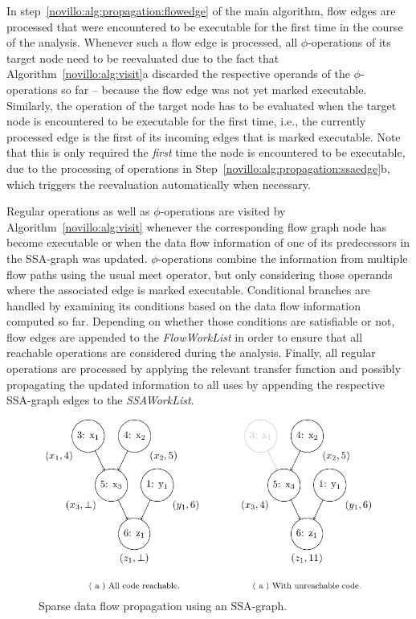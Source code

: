 In step~\ref{novillo:alg:propagation:flowedge} of the main algorithm, flow edges
are processed that were encountered to be executable for the first time in the
course of the analysis. Whenever such a flow edge is processed, all
$\phi$-operations of its target node need to be reevaluated due to the fact that
Algorithm~\ref{novillo:alg:visit}a discarded the respective operands of the
$\phi$-operations so far -- because the flow edge was not yet marked executable.
Similarly, the operation of the target node has to be evaluated when the target
node is encountered to be executable for the first time, i.e., the currently
processed edge is the first of its incoming edges that is marked executable.
Note that this is only required the \emph{first} time the node is
encountered to be executable, due to the processing of operations in
Step~\ref{novillo:alg:propagation:ssaedge}b, which triggers the reevaluation
automatically when necessary.

Regular operations as well as $\phi$-operations are visited by
Algorithm~\ref{novillo:alg:visit} whenever the corresponding flow graph node has
become executable or when the data flow information of one of its predecessors
in the SSA-graph was updated. $\phi$-operations combine the information from
multiple flow paths using the usual meet operator, but only considering those
operands where the associated edge is marked executable. Conditional branches
are handled by examining its conditions based on the data flow information
computed so far. Depending on whether those conditions are satisfiable or not,
flow edges are appended to the \emph{FlowWorkList} in order to ensure that all
reachable operations are considered during the analysis. Finally, all regular
operations are processed by applying the relevant transfer function and possibly
propagating the updated information to all uses by appending the respective
SSA-graph edges to the \emph{SSAWorkList}.

\begin{figure}[t!]
  \begin{center}
    \includegraphics{ssa_propagation}
    \subfigure{\label{novillo:fig:ssa_propagation:a}}
    \subfigure{\label{novillo:fig:ssa_propagation:b}}
  \end{center}
  \vspace{-2em}
  \caption{Sparse data flow propagation using an SSA-graph.}
  \label{novillo:fig:ssa_propagation}
\end{figure}


